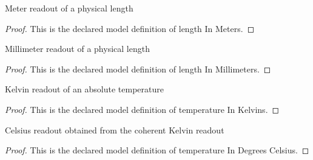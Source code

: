 \begin{definition}
  \label{def:physics:phyx-mini-0391:phyxminiproblems-problemphyxmini0391-lengthinmeters}
  Meter readout of a physical length
\end{definition}
\begin{proof}
  This is the declared model definition of length In Meters.
\end{proof}
\begin{definition}
  \label{def:physics:phyx-mini-0391:phyxminiproblems-problemphyxmini0391-lengthinmillimeters}
  Millimeter readout of a physical length
\end{definition}
\begin{proof}
  This is the declared model definition of length In Millimeters.
\end{proof}
\begin{definition}
  \label{def:physics:phyx-mini-0391:phyxminiproblems-problemphyxmini0391-temperatureinkelvins}
  Kelvin readout of an absolute temperature
\end{definition}
\begin{proof}
  This is the declared model definition of temperature In Kelvins.
\end{proof}
\begin{definition}
  \label{def:physics:phyx-mini-0391:phyxminiproblems-problemphyxmini0391-temperatureindegreescelsius}
  Celsius readout obtained from the coherent Kelvin readout
\end{definition}
\begin{proof}
  This is the declared model definition of temperature In Degrees Celsius.
\end{proof}
